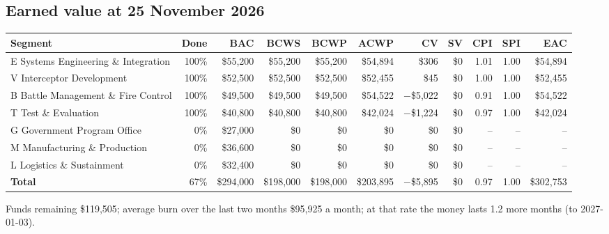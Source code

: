 \documentclass[12pt,letterpaper,oneside]{article}
\newcommand{\figfont}{\fontsize{9}{11}\selectfont}   %
\begin{document}
\subsection{Earned value at 25 November 2026}
{\figfont\setlength{\tabcolsep}{3pt}
\begin{tabular}{@{}l r r r r r r r r r r@{}}
\toprule
Segment & Done & BAC & BCWS & BCWP & ACWP & CV & SV & CPI & SPI & EAC \\
\midrule
E Systems Engineering \& Integration & 100\% & \$55,200 & \$55,200 & \$55,200 & \$54,894 & \$306 & \$0 & 1.01 & 1.00 & \$54,894 \\
V Interceptor Development & 100\% & \$52,500 & \$52,500 & \$52,500 & \$52,455 & \$45 & \$0 & 1.00 & 1.00 & \$52,455 \\
B Battle Management \& Fire Control & 100\% & \$49,500 & \$49,500 & \$49,500 & \$54,522 & $-$\$5,022 & \$0 & 0.91 & 1.00 & \$54,522 \\
T Test \& Evaluation & 100\% & \$40,800 & \$40,800 & \$40,800 & \$42,024 & $-$\$1,224 & \$0 & 0.97 & 1.00 & \$42,024 \\
G Government Program Office & 0\% & \$27,000 & \$0 & \$0 & \$0 & \$0 & \$0 & -- & -- & -- \\
M Manufacturing \& Production & 0\% & \$36,600 & \$0 & \$0 & \$0 & \$0 & \$0 & -- & -- & -- \\
L Logistics \& Sustainment & 0\% & \$32,400 & \$0 & \$0 & \$0 & \$0 & \$0 & -- & -- & -- \\
\midrule
\textbf{Total} & 67\% & \$294,000 & \$198,000 & \$198,000 & \$203,895 & $-$\$5,895 & \$0 & 0.97 & 1.00 & \$302,753 \\
\bottomrule
\end{tabular}}

Funds remaining \$119,505; average burn over the last two months \$95,925 a month; at that rate the money lasts 1.2 more months (to 2027-01-03).
\end{document}
